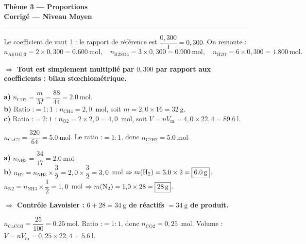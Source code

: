 \documentclass[11pt,a4paper]{article}
\newcommand{\nq}[1]{n_{\text{#1}}}
\newcommand{\Vm}{V_{\mathrm m}}
\newcommand{\rep}[1]{\par\smallskip\noindent\textbf{\color{corrcol}$\Rightarrow$ #1}}
\begin{document}
\begin{center}
{\LARGE\bfseries\color{primarydark}Thème 3 — Proportions}\\[1pt]
{\large\color{corrcol}\textbf{Corrigé — Niveau Moyen}}\\
{\color{primary}\rule{0.6\linewidth}{1pt}}
\end{center}

\begin{cor}
Le coefficient de  vaut 1 : le rapport de référence est $\dfrac{0{,}300}{1}=0{,}300$. On remonte :
\[
\nq{Al(OH)3}=2\times0{,}300=\boxed{\SI{0,600}{\mole}},\quad
\nq{H2SO4}=3\times0{,}300=\boxed{\SI{0,900}{\mole}},\quad
\nq{H2O}=6\times0{,}300=\boxed{\SI{1,800}{\mole}}.
\]
\rep{Tout est simplement multiplié par $0{,}300$ par rapport aux coefficients : bilan stœchiométrique.}
\end{cor}

\begin{cor}
\textbf{a)} $\nq{CO2}=\dfrac{m}{M}=\dfrac{88}{44}=\SI{2,0}{\mole}$.\\
\textbf{b)} Ratio :$=1:1$ : $\nq{CH4}=2{,}0$~mol, soit $m=2{,}0\times16=\boxed{\SI{32}{\gram}}$.\\
\textbf{c)} Ratio :$=2:1$ : $\nq{O2}=2\times2{,}0=4{,}0$~mol, soit
$V=n\Vm=4{,}0\times22{,}4=\boxed{\SI{89,6}{\litre}}$.
\end{cor}

\begin{cor}
$\nq{CaC2}=\dfrac{320}{64}=\SI{5,0}{\mole}$. Le ratio :$=1:1$, donc
$\nq{C2H2}=\boxed{\SI{5,0}{\mole}}$.
\end{cor}

\begin{cor}
\textbf{a)} $\nq{NH3}=\dfrac{34}{17}=\SI{2,0}{\mole}$.\\
\textbf{b)} $\nq{H2}=\nq{NH3}\times\dfrac{3}{2}=2{,}0\times\dfrac{3}{2}=3{,}0$~mol $\Rightarrow m(\ce{H2})=3{,}0\times2=\boxed{\SI{6,0}{\gram}}$.\\
\phantom{b)} $\nq{N2}=\nq{NH3}\times\dfrac{1}{2}=1{,}0$~mol $\Rightarrow m(\ce{N2})=1{,}0\times28=\boxed{\SI{28}{\gram}}$.
\rep{Contrôle Lavoisier : $6+28=\SI{34}{\gram}$ de réactifs $=\SI{34}{\gram}$ de \ce{NH3} produit. \checkmark}
\end{cor}

\begin{cor}
$\nq{CaCO3}=\dfrac{25}{100}=\SI{0,25}{\mole}$. Ratio :$=1:1$, donc $\nq{CO2}=0{,}25$~mol.
Volume : $V=n\Vm=0{,}25\times22{,}4=\boxed{\SI{5,6}{\litre}}$.
\end{cor}
\end{document}
